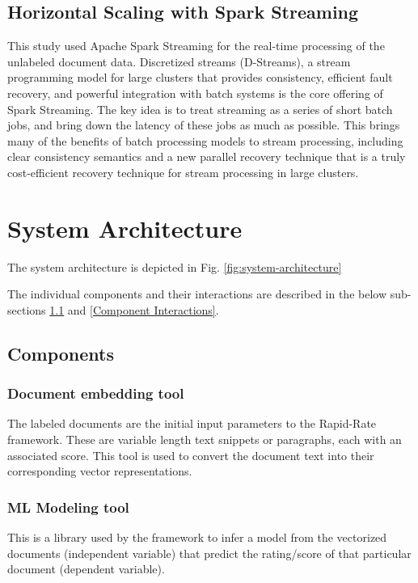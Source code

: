\documentclass[conference]{IEEEtran}
\begin{document}
    \subsection{Horizontal Scaling with Spark Streaming}
    This study used Apache Spark Streaming for the real-time processing of the unlabeled document data. Discretized streams (D-Streams), a stream programming model for large clusters that provides consistency, efficient fault recovery, and powerful integration with batch systems is the core offering of Spark Streaming. The key idea is to treat streaming as a series of short batch jobs, and bring down the latency of these jobs as much as possible. This brings many of the benefits of batch processing models to stream processing, including clear consistency semantics and a new parallel recovery technique that is a truly cost-efficient recovery technique for stream processing in large clusters\cite{zaharia2012discretized}.

\vspace{5mm}

\section{System Architecture}
The system architecture is depicted in Fig. \ref{fig:system-architecture}

The individual components and their interactions are described in the below sub-sections \ref{Components} and \ref{Component Interactions}.

    \subsection{Components} \label{Components}

        \subsubsection{Document embedding tool}
        The labeled documents are the initial input parameters to the Rapid-Rate framework. These are variable length text snippets or paragraphs, each with an associated score. This tool is used to convert the document text into their corresponding vector representations.

        \subsubsection{ML Modeling tool}
        This is a library used by the framework to infer a model from the vectorized documents (independent variable) that predict the rating/score of that particular document (dependent variable). 
\end{document}
